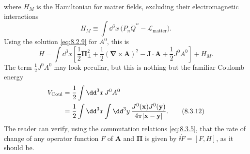 
where $H_M$ is the Hamiltonian for matter fields, excluding their
electromagnetic interactions
\[
H_M\equiv\int \dd^3x\,
  \bigl(P_n\dot Q^n-\mathcal L_{\mathrm{matter}}\bigr).
\]
Using the solution \eqref{eq:8.2.9} for $A^0$, this is
\begin{equation}
H=\int \dd^3x\left[
  \frac12\boldsymbol{\Pi}_{\!\perp}^{2}
  +\frac12(\boldsymbol\nabla\times\mathbf A)^2
  -\mathbf J\cdot\mathbf A+\frac12J^0A^0
\right]+H_M.
\tag{8.3.11}\label{eq:8.3.11}
\end{equation}
The term $\frac12J^0A^0$ may look peculiar, but this is nothing but the
familiar Coulomb energy
\begin{align}
V_{\mathrm{Coul}}
&=\frac12\int \dd^3x\,J^0A^0
\notag\\
&=\frac12\int \dd^3x\int \dd^3y\,
  \frac{J^0(\mathbf x)J^0(\mathbf y)}{4\pi\lvert\mathbf x-\mathbf y\rvert}.
\tag{8.3.12}\label{eq:8.3.12}
\end{align}
The reader can verify, using the commutation relations \eqref{eq:8.3.5}, that the
rate of change of any operator function $F$ of $\mathbf A$ and
$\boldsymbol\Pi$ is given by $\ii\dot F=[F,H]$, as it should be.
